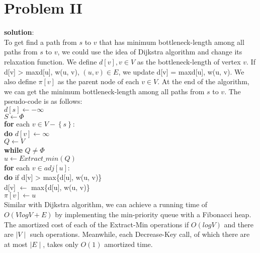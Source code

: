\section{Problem II}
\textbf{solution}:\\
To get find a path from $s$ to $v$ that has minimum bottleneck-length among all paths from $s$ to $v$, we could use the idea of Dijkstra algorithm and change its relaxation function. We define $d[v], v \in V$ as the bottleneck-length of vertex $v$. If d[v] > max{d[u], w(u, v)}, $(u, v) \in E$, we update d[v] = max{d[u], w(u, v)}. We also define $\pi[v]$ as the parent node of each $v \in V$. At the end of the algorithm, we can get the minimum bottleneck-length among all paths from $s$ to $v$. The pseudo-code is as follows:\\

$d[s] \gets -\infty
$\\
$S \gets \Phi$\\
\textbf{for} each $v \in V - \left\{ s \right\}$:\\
 \hspace*{0.6cm} \textbf{do} $d[v] \gets \infty$\\
 $Q \gets V$\\
 \textbf{while} $Q \neq \Phi$\\
 \hspace*{0.6cm} $u \gets Extract\_min(Q)$\\
 \hspace*{0.6cm} \textbf{for} each $v \in adj[u]$:\\
 \hspace*{0.6cm} \hspace*{0.6cm} \textbf{do} if d[v] > max\{d[u], w(u, v)\}\\
\hspace*{0.6cm} \hspace*{0.6cm} \hspace*{0.6cm} d[v] $\gets$ max\{d[u], w(u, v)\}\\
\hspace*{0.6cm} \hspace*{0.6cm} \hspace*{0.6cm} $\pi[v] \gets u$\\

Similar with Dijkstra algorithm, we can achieve a running time of $O(VlogV + E)$ by implementing the min-priority queue with a Fibonacci heap. The amortized cost of each of the Extract-Min operations if $O(logV)$ and there are $\mid V \mid$ such operations. Meanwhile, each Decrease-Key call, of which there are at most $\mid E \mid$, takes only $O(1)$ amortized time. 